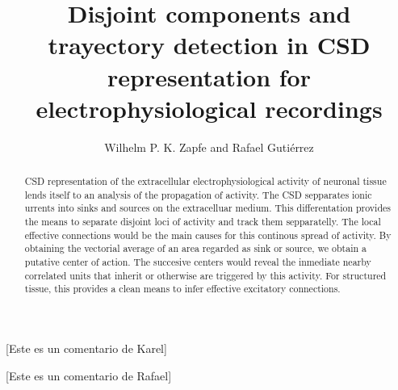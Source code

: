 \documentclass[letterpaper,12pts]{article}
\title{Disjoint components and trayectory detection in CSD representation
for electrophysiological recordings}
\author{Wilhelm P. K. Zapfe and Rafael Gutiérrez}
\newcommand{\komment}[1]{{\color{red} [#1]}}
\newcommand{\romment}[1]{{\color{blue} [#1]}}
\begin{document}
\onecolumn





\maketitle

\begin{abstract}

CSD representation of the extracellular electrophysiological activity of neuronal tissue lends itself
to an analysis of the propagation of activity. The CSD sepparates ionic urrents into sinks and sources on the extracelluar medium.
This differentation provides the means to separate disjoint loci of activity
and track them sepparatelly. The local effective connections would be the
main causes for this continous spread of activity. By obtaining the vectorial
average of an area regarded as sink or source, we obtain a putative center of
action. The succesive centers would reveal the inmediate nearby correlated
units that inherit or otherwise are triggered by this activity. For
structured tissue, this provides a clean means to infer effective excitatory
connections.


\end{abstract}

\komment{Este es un comentario de Karel}

\romment{Este es un comentario de Rafael}
\end{document}
